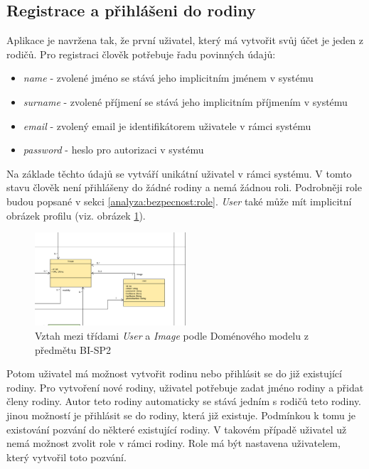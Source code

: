     \subsection{Registrace a přihlášeni do rodiny}
        Aplikace je navržena tak, že první uživatel, který má vytvořit svůj účet je jeden z rodičů. Pro registraci člověk potřebuje řadu povinných údajů:
        \begin{itemize}
	        \item \textit{name} - zvolené jméno se stává jeho implicitním jménem v systému
	        \item \textit{surname} - zvolené příjmení se stává jeho implicitním příjmením v systému
	        \item \textit{email} - zvolený email je identifikátorem uživatele v rámci systému
	        \item \textit{password} - heslo pro autorizaci v systému
        \end{itemize}
        Na základe těchto údajů se vytváří unikátní uživatel v rámci systému. V tomto stavu člověk není přihlášeny do žádné rodiny a nemá žádnou roli. Podrobněji role budou popsané v sekci \ref{analyza:bezpecnost:role}. \textit{User} také může mít implicitní obrázek profilu (viz. obrázek \ref{image:User-Image1}).
        \begin{figure}\centering
	        \includegraphics[width=0.5\textwidth]{pdfs/User-Image1}
	        \caption[Návrh User-Image]{Vztah mezi třídami \textit{User} a \textit{Image} podle Doménového modelu z předmětu BI-SP2}\label{image:User-Image1}
        \end{figure}
        
        Potom uživatel má možnost vytvořit rodinu nebo přihlásit se do již existující rodiny. Pro vytvoření nové rodiny, uživatel potřebuje zadat jméno rodiny a přidat členy rodiny. Autor teto rodiny automaticky se stává jedním s rodičů teto rodiny. jinou možností je přihlásit se do rodiny, která již existuje. Podmínkou k tomu je existování pozvání do některé existující rodiny. V takovém případě uživatel už nemá možnost zvolit role v rámci rodiny. Role má být nastavena uživatelem, který vytvořil toto pozvání.

